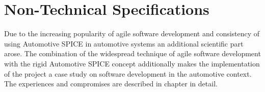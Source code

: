 \section{Non-Technical Specifications}
Due to the increasing popularity of agile software development and consistency of using Automotive SPICE in automotive systems 
an additional scientific part arose. The combination of  the  widespread technique of agile software development with the  rigid Automotive 
SPICE concept additionally makes the implementation of the project a case study on software development in the automotive context. 
The experiences and compromises are described in chapter  in detail. 

